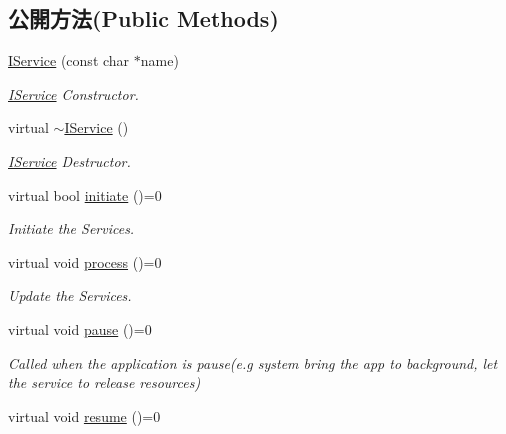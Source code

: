 \subsection*{公開方法(Public Methods)}
\begin{DoxyCompactItemize}
\item 
\hyperlink{class_magnum_1_1_i_service_a1aac9e145dbdf43cb9c9e40d815139f6}{I\+Service} (const char $\ast$name)
\begin{DoxyCompactList}\small\item\em \hyperlink{class_magnum_1_1_i_service}{I\+Service} Constructor. \end{DoxyCompactList}\item 
virtual \hyperlink{class_magnum_1_1_i_service_a76b0f503e4627f25af465e3a72569d70}{$\sim$\+I\+Service} ()
\begin{DoxyCompactList}\small\item\em \hyperlink{class_magnum_1_1_i_service}{I\+Service} Destructor. \end{DoxyCompactList}\item 
virtual bool \hyperlink{class_magnum_1_1_i_service_a176411207a279a2d22aaec10a74861fe}{initiate} ()=0
\begin{DoxyCompactList}\small\item\em Initiate the Services. \end{DoxyCompactList}\item 
virtual void \hyperlink{class_magnum_1_1_i_service_aae20d6a5d19fae0c57cb9a07e9324f70}{process} ()=0\hypertarget{class_magnum_1_1_i_service_aae20d6a5d19fae0c57cb9a07e9324f70}{}\label{class_magnum_1_1_i_service_aae20d6a5d19fae0c57cb9a07e9324f70}

\begin{DoxyCompactList}\small\item\em Update the Services. \end{DoxyCompactList}\item 
virtual void \hyperlink{class_magnum_1_1_i_service_abca13b990628a1839cbe01fdcc3e337c}{pause} ()=0\hypertarget{class_magnum_1_1_i_service_abca13b990628a1839cbe01fdcc3e337c}{}\label{class_magnum_1_1_i_service_abca13b990628a1839cbe01fdcc3e337c}

\begin{DoxyCompactList}\small\item\em Called when the application is pause(e.\+g system bring the app to background, let the service to release resources) \end{DoxyCompactList}\item 
virtual void \hyperlink{class_magnum_1_1_i_service_af634d96ecf2d243c61875def6897587a}{resume} ()=0\hypertarget{class_magnum_1_1_i_service_af634d96ecf2d243c61875def6897587a}{}\label{class_magnum_1_1_i_service_af634d96ecf2d243c61875def6897587a}


\end{DoxyCompactItemize}
